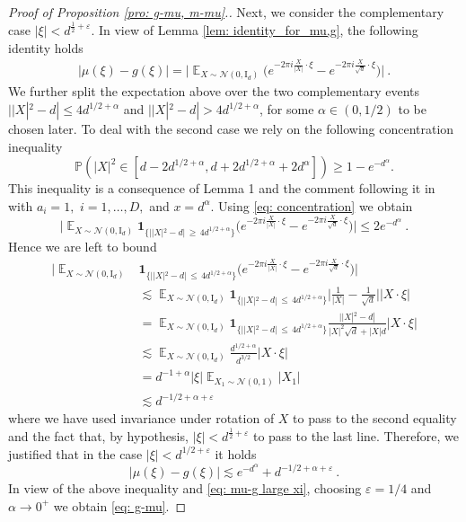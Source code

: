 \documentclass[a4paper, reqno]{amsart}
\theoremstyle{definition}
\begin{document}
\begin{proof}[Proof of Proposition \ref{pro: g-mu, m-mu}.]
Next, we consider the complementary case $|\xi| < d^{\tfrac{1}{2}+\varepsilon}$. In view of Lemma \ref{lem: identity_for_mu,g}, the following identity holds 
\begin{align*}
    |\mu(\xi)-g(\xi)|= \bigg|\mathop{\mathbb{E}}_{X\sim \mathcal{N}(0,\textrm{I}_d)}\bigg(e^{-2\pi i \tfrac{X}{|X|}\cdot \xi} - e^{- 2\pi i \tfrac{X}{\sqrt{d}}\cdot \xi} \bigg) \bigg|~.
\end{align*}
We further split the expectation above over the two complementary events $||X|^2-d|\leq 4d^{1/2+\alpha}$ and $||X|^2-d| > 4d^{1/2+\alpha}$, for some $\alpha\in(0,1/2)$ to be chosen later. To deal with the second case we rely on the following concentration inequality 
\begin{equation}
\label{eq: concentration}
\mathbb{P}(|X|^2\in [d-2d^{1/2+\alpha}, d+ 2d^{1/2+\alpha} + 2d^{\alpha}])\geq 1- e^{-d^\alpha}.\end{equation}
This inequality is a consequence of Lemma 1 and the comment following it in \cite{LaMa} with $a_i=1,$ $i=1,\ldots,D,$ and $x=d^{\alpha}$. Using \eqref{eq: concentration} we obtain
$$\bigg|\mathop{\mathbb{E}}_{X\sim \mathcal{N}(0,\textrm{I}_d)} \mathbf{1}_{\lbrace ||X|^2-d|\, \geq \, 4d^{1/2+\alpha} \rbrace}\big(e^{-2\pi i \tfrac{X}{|X|}\cdot \xi} - e^{- 2\pi i \tfrac{X}{\sqrt{d}}\cdot \xi} \big) \bigg| \leq 2 e^{-d^\alpha} ~.$$
Hence we are left to bound 
\begin{align*}
    \bigg|\mathop{\mathbb{E}}_{X\sim \mathcal{N}(0,\textrm{I}_d)} & \mathbf{1}_{\lbrace ||X|^2-d|\, \leq \, 4d^{1/2+\alpha} \rbrace}\big(e^{-2\pi i \tfrac{X}{|X|}\cdot \xi} - e^{- 2\pi i \tfrac{X}{\sqrt{d}}\cdot \xi} \big) \bigg| \\
    & \lesssim \mathop{\mathbb{E}}_{X\sim \mathcal{N}(0,\textrm{I}_d)} \mathbf{1}_{\lbrace ||X|^2-d|\, \leq \, 4d^{1/2+\alpha} \rbrace} \big|\tfrac{1}{|X|}-\tfrac{1}{\sqrt{d}}\big| |X\cdot\xi| \\
    &= \mathop{\mathbb{E}}_{X\sim \mathcal{N}(0,\textrm{I}_d)} \mathbf{1}_{\lbrace ||X|^2-d|\, \leq \, 4d^{1/2+\alpha} \rbrace} \tfrac{||X|^2-d|}{|X|^2\sqrt{d}+|X|d} |X\cdot\xi| \\
    & \lesssim \mathop{\mathbb{E}}_{X\sim \mathcal{N}(0,\textrm{I}_d)}\tfrac{d^{1/2+\alpha}}{d^{3/2}} |X\cdot\xi| \\
    & =d^{-1+\alpha}|\xi| \mathop{\mathbb{E}}_{{X_1} \sim \mathcal{N}(0,1)} |{X_1}|\\
    & \lesssim d^{-1/2+\alpha+\varepsilon}
\end{align*}
 where we have used invariance under rotation of $X$ to pass to the second equality and the fact that, by hypothesis, $|\xi| < d^{\tfrac{1}{2}+\varepsilon}$ to pass to the last line. Therefore, we justified that in the case $|\xi|<d^{1/2+\varepsilon}$ it holds
 \begin{equation*}
|\mu(\xi)-g(\xi)|\lesssim e^{-d^{\alpha}}+d^{-1/2+\alpha+\varepsilon}~.\end{equation*} 
In view of the above inequality and \eqref{eq: mu-g large xi}, choosing $\varepsilon=1/4$ and $\alpha\to 0^+$ we obtain \eqref{eq: g-mu}.


\end{proof}
\end{document}
